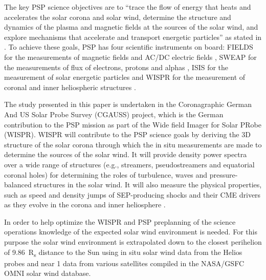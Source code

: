 The key PSP science objectives are to “trace the flow of energy that heats and accelerates the solar corona and solar wind, determine the structure and dynamics of the plasma and magnetic fields at the sources of the solar wind, and explore mechanisms that accelerate and transport energetic particles” as stated in \citet{Fox2015}. To achieve these goals, PSP has four scientific instruments on board: FIELDS for the measurements of magnetic fields and AC/DC electric fields \citep{Bale2016}, SWEAP for the measurements of flux of electrons, protons and alphas \citep{Kasper2016}, IS\sun{}IS for the measurement of solar energetic particles \citep{McComas2016} and WISPR for the measurement of coronal and inner heliospheric structures \citep{Vourlidas2016}.

The study presented in this paper is undertaken in the Coronagraphic German And US Solar Probe Survey (CGAUSS) project, which is the German contribution to the PSP mission as part of the Wide field Imager for Solar PRobe (WISPR). WISPR will contribute to the PSP science goals by deriving the 3D structure of the solar corona through which the in situ measurements are made to determine the sources of the solar wind. It will provide density power spectra over a wide range of structures (e.g., streamers, pseudostreamers and equatorial coronal holes) for determining the roles of turbulence, waves and pressure-balanced structures in the solar wind. It will also measure the physical properties, such as speed and density jumps of SEP-producing shocks and their CME drivers as they evolve in the corona and inner heliosphere \citep{Vourlidas2016}.

In order to help optimize the WISPR and PSP preplanning of the science operations knowledge of the expected solar wind environment is needed. For this purpose the solar wind environment is extrapolated down to the closest perihelion of \SI{9.86}{R_s} distance to the Sun using in situ solar wind data from the Helios probes and near \SI{1}{\au} data from various satellites compiled in the NASA/GSFC OMNI solar wind database.\\


